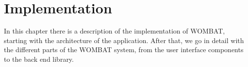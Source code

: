 \chapter{Implementation}
\label{cha:implementation}

In this chapter there is a description of the implementation of WOMBAT, starting with the architecture of the application. After that, we go in detail with the different parts of the WOMBAT system, from the user interface components to the back end library.









